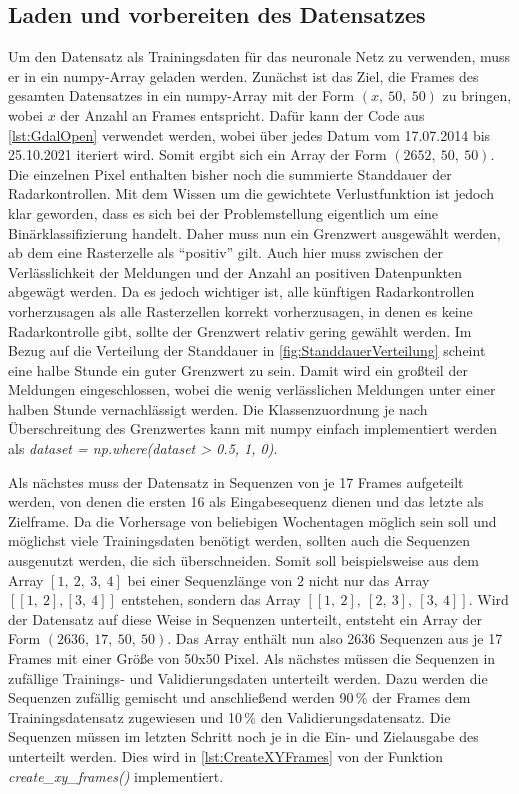 \subsection{Laden und vorbereiten des Datensatzes}
\label{sec:DatensatzLaden}
Um den Datensatz als Trainingsdaten für das neuronale Netz zu verwenden, muss er in ein numpy-Array geladen werden.
Zunächst ist das Ziel, die Frames des gesamten Datensatzes in ein numpy-Array mit der Form $(x,~50,~50)$ zu bringen, wobei $x$ der Anzahl an Frames entspricht.
Dafür kann der Code aus \autoref{lst:GdalOpen} verwendet werden, wobei über jedes Datum vom 17.07.2014 bis 25.10.2021 iteriert wird.
Somit ergibt sich ein Array der Form $(2652,~50,~50)$.
Die einzelnen Pixel enthalten bisher noch die summierte Standdauer der Radarkontrollen.
Mit dem Wissen um die gewichtete Verlustfunktion ist jedoch klar geworden, dass es sich bei der Problemstellung eigentlich um eine Binärklassifizierung handelt.
Daher muss nun ein Grenzwert ausgewählt werden, ab dem eine Rasterzelle als "`positiv"' gilt.
Auch hier muss zwischen der Verlässlichkeit der Meldungen und der Anzahl an positiven Datenpunkten abgewägt werden.
Da es jedoch wichtiger ist, alle künftigen Radarkontrollen vorherzusagen als alle Rasterzellen korrekt vorherzusagen, in denen es keine Radarkontrolle gibt, sollte der Grenzwert relativ gering gewählt werden.
Im Bezug auf die Verteilung der Standdauer in \autoref{fig:StanddauerVerteilung} scheint eine halbe Stunde ein guter Grenzwert zu sein.
Damit wird ein großteil der Meldungen eingeschlossen, wobei die wenig verlässlichen Meldungen unter einer halben Stunde vernachlässigt werden.
Die Klassenzuordnung je nach Überschreitung des Grenzwertes kann mit numpy einfach implementiert werden als \emph{dataset = np.where(dataset > 0.5, 1, 0)}.

Als nächstes muss der Datensatz in Sequenzen von je 17 Frames aufgeteilt werden, von denen die ersten 16 als Eingabesequenz dienen und das letzte als Zielframe.
Da die Vorhersage von beliebigen Wochentagen möglich sein soll und möglichst viele Trainingsdaten benötigt werden, sollten auch die Sequenzen ausgenutzt werden, die sich überschneiden.
Somit soll beispielsweise aus dem Array $[1,~2,~3,~4]$ bei einer Sequenzlänge von $2$ nicht nur das Array $[[1,~2], [3,~4]]$ entstehen, sondern das Array $[[1,~2],~[2,~3],~[3,~4]]$.
Wird der Datensatz auf diese Weise in Sequenzen unterteilt, entsteht ein Array der Form $(2636,~17,~50,~50)$.
Das Array enthält nun also 2636 Sequenzen aus je 17 Frames mit einer Größe von 50x50 Pixel.
Als nächstes müssen die Sequenzen in zufällige Trainings- und Validierungsdaten unterteilt werden.
Dazu werden die Sequenzen zufällig gemischt und anschließend werden 90\,\% der Frames dem Trainingsdatensatz zugewiesen und 10\,\% den Validierungsdatensatz.
Die Sequenzen müssen im letzten Schritt noch je in die Ein- und Zielausgabe des  unterteilt werden.
Dies wird in \autoref{lst:CreateXYFrames} von der Funktion \emph{create\_xy\_frames()} implementiert.

